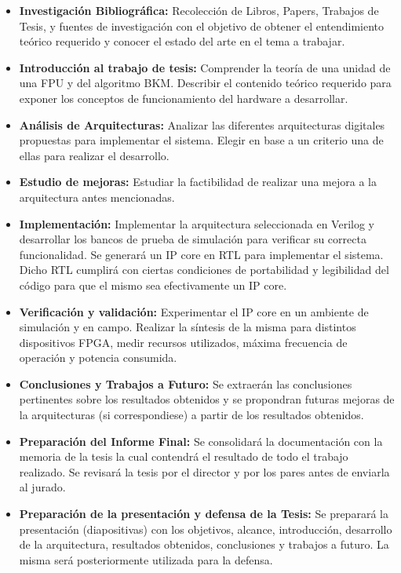 \documentclass[a4paper]{article}
\begin{document}
\begin{itemize}
    \item \textbf{Investigación Bibliográfica:} Recolección de Libros, Papers, Trabajos de Tesis, y fuentes de investigación con el objetivo de obtener el entendimiento teórico requerido y conocer el estado del arte en el tema a trabajar.
    \item \textbf{Introducción al trabajo de tesis:} Comprender la teoría de una unidad de una FPU y del algoritmo BKM. Describir el contenido teórico requerido para exponer los conceptos de funcionamiento del hardware a desarrollar.
    \item \textbf{Análisis de Arquitecturas:} Analizar las diferentes arquitecturas digitales propuestas para implementar el sistema. Elegir en base a un criterio una de ellas para realizar el desarrollo.
    \item \textbf{Estudio de mejoras:} Estudiar la factibilidad de realizar una mejora a la arquitectura antes mencionadas.
    \item \textbf{Implementación:} Implementar la arquitectura seleccionada en Verilog y desarrollar los bancos de prueba de simulación para verificar su correcta funcionalidad. Se generará un IP core en RTL para implementar el sistema. Dicho RTL cumplirá con ciertas condiciones de portabilidad y legibilidad del código para que el mismo sea efectivamente un IP core.
    \item \textbf{Verificación y validación:} Experimentar el IP core en un ambiente de simulación y en campo. Realizar la síntesis de la misma para distintos dispositivos FPGA, medir recursos utilizados, máxima frecuencia de operación y potencia consumida.
    \item \textbf{Conclusiones y Trabajos a Futuro:} Se extraerán las conclusiones pertinentes sobre los resultados obtenidos y se propondran futuras mejoras de la arquitecturas (si correspondiese) a partir de los resultados obtenidos.
    \item \textbf{Preparación del Informe Final:} Se consolidará la documentación con la memoria de la tesis la cual contendrá el resultado de todo el trabajo realizado. Se revisará la tesis por el director y por los pares antes de enviarla al jurado.
    \item \textbf{Preparación de la presentación y defensa de la Tesis:} Se preparará la presentación (diapositivas) con los objetivos, alcance, introducción, desarrollo de la arquitectura, resultados obtenidos, conclusiones y trabajos a futuro. La misma será posteriormente utilizada para la defensa.
\end{itemize}
\end{document}
